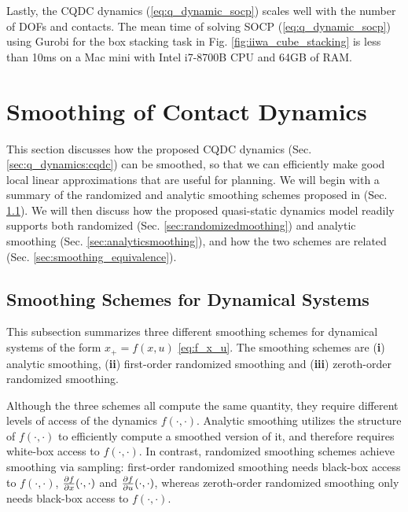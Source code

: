 Lastly, the CQDC dynamics (\ref{eq:q_dynamic_socp}) scales well with the number of DOFs and contacts. The mean time of solving SOCP (\ref{eq:q_dynamic_socp}) using Gurobi \cite{gurobi} for the box stacking task in Fig. \ref{fig:iiwa_cube_stacking} is less than 10ms on a Mac mini with Intel i7-8700B CPU and 64GB of RAM. 

\newpage
\section{Smoothing of Contact Dynamics} \label{sec:smoothing}
This section discusses how the proposed CQDC dynamics (Sec. \ref{sec:q_dynamics:cqdc}) can be smoothed, so that we can efficiently make good local linear approximations that are useful for planning.
We will begin with a summary of the randomized and analytic smoothing schemes proposed in \cite[Section II]{pang2022global} (Sec. \ref{sec:smoothdynamics}). 
We will then discuss how the proposed quasi-static dynamics model readily supports both randomized (Sec. \ref{sec:randomizedmoothing}) and analytic smoothing (Sec. \ref{sec:analyticsmoothing}), and how the two schemes are related (Sec. \ref{sec:smoothing_equivalence}). 


\subsection{Smoothing Schemes for Dynamical Systems}
\label{sec:smoothdynamics}
This subsection summarizes three different smoothing schemes for dynamical systems of the form $x_+ = f(x, u)$ \eqref{eq:f_x_u}. The smoothing schemes are (\textbf{i}) analytic smoothing, (\textbf{ii}) first-order randomized smoothing and (\textbf{iii}) zeroth-order randomized smoothing.

Although the three schemes all compute the same quantity, they require different levels of access of the dynamics $f(\cdot, \cdot)$. Analytic smoothing utilizes the structure of $f(\cdot, \cdot)$ to efficiently compute a smoothed version of it, and therefore requires white-box access to $f(\cdot, \cdot)$. In contrast, randomized smoothing schemes achieve smoothing via sampling: first-order randomized smoothing needs black-box access to $f(\cdot, \cdot)$, $\frac{\partial {f}}{\partial {x}}(\cdot, \cdot)$ and $\frac{\partial {f}}{\partial {u}}(\cdot, \cdot)$, whereas zeroth-order randomized smoothing only needs black-box access to $f(\cdot, \cdot)$.


